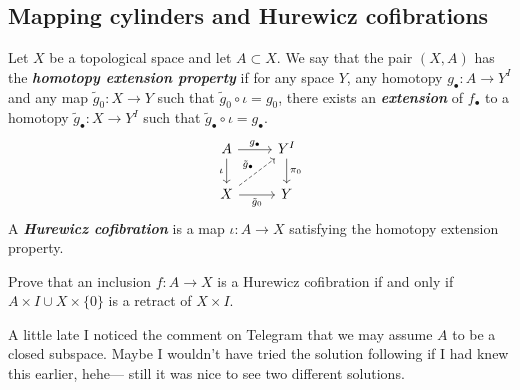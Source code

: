 \subsection{Mapping cylinders and Hurewicz cofibrations}
\begin{defn}
	Let $X$ be a topological space and let $A\subset X$. We say that the pair $(X,A)$ has the \textbf{\textit{homotopy extension property}} if for any space $Y$, any homotopy $g_\bullet:A\to Y^I$ and any map $\tilde{g}_0:X\to Y$ such that $\tilde{g}_0\circ\iota=g_0$, there exists an \textbf{\textit{extension}} of $f_\bullet$ to a homotopy $\tilde{g}_\bullet:X\to Y^I$ such that $\tilde{g}_\bullet\circ\iota=g_\bullet$.
	\[\begin{tikzcd}
		A\arrow[r,"g_\bullet"]\arrow[d,swap,"\iota"]&Y^I\arrow[d,"\pi_0"]\\
		X\arrow[ur,dashed,"\tilde{g}_\bullet"]\arrow[r,swap,"\tilde{g}_0"]&Y
	\end{tikzcd}\]
	A \textbf{\textit{Hurewicz cofibration}} is a map $\iota:A\to X$ satisfying the homotopy extension property.
\end{defn}
\begin{exercise}[a] Prove that an inclusion $f:A\to X$ is a Hurewicz cofibration if and only if $A\times I\cup X\times \{0\}$ is a retract of $X\times I$.
\end{exercise}
\begin{remark}
	A little late I noticed the comment on Telegram that we may assume $A$ to be a closed subspace. Maybe I wouldn't have tried the solution following \cite{lectures} if I had knew this earlier, hehe--- still it was nice to see two different solutions.
\end{remark}
